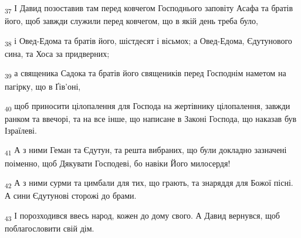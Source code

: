 \begin{tcolorbox}
\textsubscript{37} І Давид позоставив там перед ковчегом Господнього заповіту Асафа та братів його, щоб завжди служили перед ковчегом, що в якій день треба було,
\end{tcolorbox}
\begin{tcolorbox}
\textsubscript{38} і Овед-Едома та братів його, шістдесят і вісьмох; а Овед-Едома, Єдутунового сина, та Хоса за придверних;
\end{tcolorbox}
\begin{tcolorbox}
\textsubscript{39} а священика Садока та братів його священиків перед Господнім наметом на пагірку, що в Ґів'оні,
\end{tcolorbox}
\begin{tcolorbox}
\textsubscript{40} щоб приносити цілопалення для Господа на жертівнику цілопалення, завжди ранком та ввечорі, та на все інше, що написане в Законі Господа, що наказав був Ізраїлеві.
\end{tcolorbox}
\begin{tcolorbox}
\textsubscript{41} А з ними Геман та Єдутун, та решта вибраних, що були докладно зазначені поіменно, щоб Дякувати Господеві, бо навіки Його милосердя!
\end{tcolorbox}
\begin{tcolorbox}
\textsubscript{42} А з ними сурми та цимбали для тих, що грають, та знаряддя для Божої пісні. А сини Єдутунові сторожі до брами.
\end{tcolorbox}
\begin{tcolorbox}
\textsubscript{43} І порозходився ввесь народ, кожен до дому свого. А Давид вернувся, щоб поблагословити свій дім.
\end{tcolorbox}
